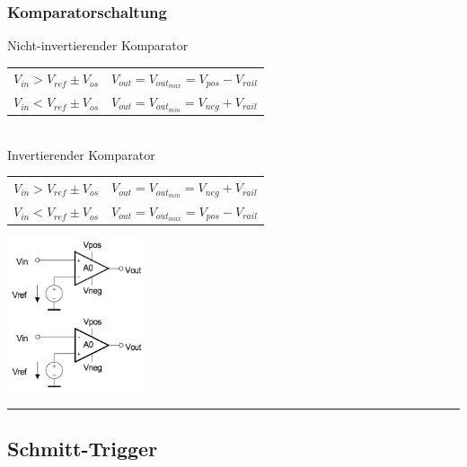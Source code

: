 		\begin{minipage}[c]{12cm}	
		\subsubsection{Komparatorschaltung}
				Nicht-invertierender Komparator \\	
            	\begin{tabular}{|l|l|} \hline
            		$V_{in} > V_{ref} \pm V_{os}$ & $V_{out} = V_{out_{max}} = V_{pos}-V_{rail}$ \\
            		$V_{in} < V_{ref} \pm V_{os}$ & $V_{out} = V_{out_{min}} = V_{neg}+V_{rail}$ \\ \hline
            	\end{tabular} \\
            	
            	Invertierender Komparator \\
            	\begin{tabular}{|l|l|} \hline
            		$V_{in} > V_{ref} \pm V_{os}$ & $V_{out} = V_{out_{min}} = V_{neg}+V_{rail}$ \\
            		$V_{in} < V_{ref} \pm V_{os}$ & $V_{out} = V_{out_{max}} = V_{pos}-V_{rail}$ \\ \hline
            	\end{tabular}
			\end{minipage}
			\begin{minipage}[c]{6cm}
            	\includegraphics[width=4cm]{./images/komparator.png} \\
            \end{minipage}
\hrule

	\subsection{Schmitt-Trigger}
